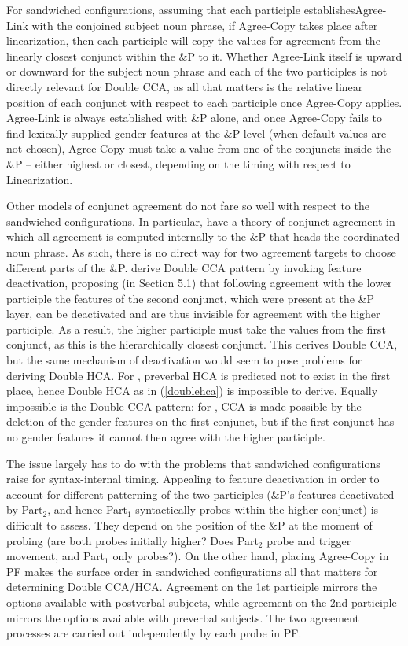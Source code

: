 \documentclass[output=paper
,modfonts
,nonflat]{langsci/langscibook}
\begin{document}
For sandwiched configurations, assuming that each participle establishes\linebreak Agree-Link with the conjoined subject noun phrase, if Agree-Copy takes place after linearization, then each participle will copy the values for agreement from the linearly closest conjunct within the \&P to it. Whether Agree-Link itself is upward or downward for the subject noun phrase and each of the two participles is not directly relevant for Double CCA, as all that matters is the relative linear position of each conjunct with respect to each participle once Agree-Copy applies. Agree-Link is always established with \&P alone, and once Agree-Copy fails to find lexically-supplied gender features at the \&P level (when default values are not chosen), Agree-Copy must take a value from one of the conjuncts inside the \&P -- either highest or closest, depending on the timing with respect to Linearization.

Other models of conjunct agreement do not fare so well with respect to the sandwiched configurations. In particular, \citet{puskarmurphy:17} have a theory of conjunct agreement in which all agreement is computed internally to the \&P that heads the coordinated noun phrase. As such, there is no direct way for two agreement targets to choose different parts of the \&P. 
\citet{puskarmurphy:17} derive Double CCA pattern by invoking feature deactivation, proposing (in Section 5.1) that following agreement with the lower participle the features of the second conjunct, which were present at the \&P layer, can be deactivated and are thus invisible for agreement with the higher participle. As a result, the higher participle must take the values from the first conjunct, as this is the hierarchically closest conjunct. This derives Double CCA, but the same mechanism of deactivation would seem to pose problems for deriving Double HCA. For \citet{boskovic:09}, preverbal HCA is predicted not to exist in the first place, hence Double HCA as in (\ref{doublehca}) is impossible to derive. Equally impossible is the Double CCA pattern: for \cite{boskovic:09}, CCA is made possible by the deletion of the gender features on the first conjunct, but if the first conjunct has no gender features it cannot then agree with the higher participle.

The issue largely has to do with the problems that sandwiched configurations raise for syntax-internal timing. Appealing to feature deactivation in order to account for different patterning of the two participles (\&P’s features deactivated by Part$_2$, and hence Part$_1$ syntactically probes within the higher conjunct) is difficult to assess. They depend on the position of the \&P at the moment of probing (are both probes initially higher? Does Part$_2$ probe and trigger movement, and Part$_1$ only probes?). On the other hand, placing Agree-Copy in PF makes the surface order in sandwiched configurations all that matters for determining Double CCA/HCA. Agreement on the 1st participle mirrors the options available with postverbal subjects, while agreement on the 2nd participle mirrors the options available with preverbal subjects. The two agreement processes are carried out independently by each probe in PF.
\end{document}
